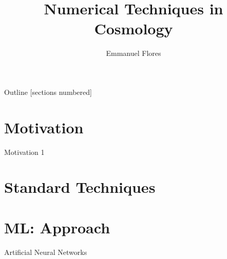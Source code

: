 \documentclass[aspectratio=169, 12pt]{beamer}
\title{Numerical Techniques in Cosmology}
\author{Emmanuel Flores}
\institute{Cosmololgy Final Presentation, \\Tufts University}
\begin{document}
\maketitle	
\begin{frame}{Outline}
	[sections numbered]
	\tableofcontents[currentsection]
\end{frame}
\section{Motivation}
\begin{frame}{Motivation 1}
	
\end{frame}
\section{Standard Techniques}
\section{ML: Approach}
\begin{frame}{Artificial Neural Networks}
	
\end{frame}
\end{document}
